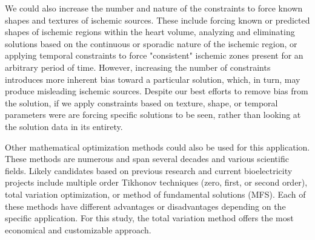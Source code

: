  We could also increase the number and nature of the constraints to force known
shapes and textures of ischemic sources. These include forcing known or predicted shapes of ischemic regions within the heart volume, analyzing and eliminating solutions based on the continuous or sporadic nature of the ischemic region, or applying temporal constraints to force "consistent" ischemic zones present for an arbitrary period of time. However, increasing the number of constraints introduces more inherent bias toward a particular solution, which, in turn, may produce misleading ischemic sources. Despite our best efforts to remove bias from the solution, if we apply constraints based on texture, shape, or temporal parameters were are forcing specific solutions to be seen, rather than looking at the solution data in its entirety. 

Other mathematical optimization methods could also be used for this application\cite{RSM:Ahm94,RSM:Bro96b,RSM:Ahm98,RSM:Gha2001,RSM:Ost92,RSM:Ost97c,RSM:Ram2003,RSM:Clu2018}. These methods are numerous and span several decades and various scientific fields. Likely candidates based on previous research and current bioelectricity projects include multiple order Tikhonov techniques (zero, first, or second order), total variation optimization, or method of fundamental solutions (MFS). Each of these methods have different advantages or disadvantages depending on the specific application. For this study, the total variation method offers the most economical and customizable approach. 



